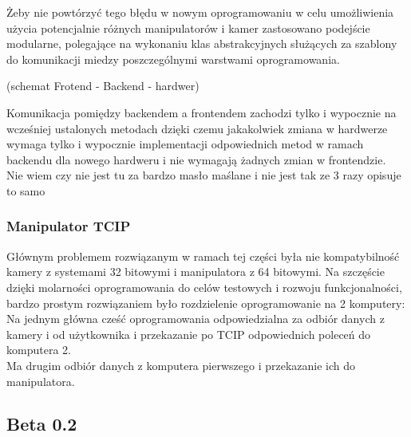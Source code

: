 \documentclass[11pt,a4paper]{article}
\begin{document}
    \hspace{1cm} Żeby nie powtórzyć tego błędu w nowym oprogramowaniu w celu umożliwienia użycia potencjalnie różnych manipulatorów i kamer zastosowano podejście modularne, polegające na wykonaniu klas abstrakcyjnych służących za szablony do komunikacji miedzy poszczególnymi warstwami oprogramowania.

            {\color{red}
    (schemat Frotend - Backend - hardwer)}


    \hspace{1cm}Komunikacja pomiędzy backendem a frontendem zachodzi tylko i wypocznie na wcześniej ustalonych metodach dzięki czemu jakakolwiek zmiana w hardwerze wymaga tylko i wypocznie implementacji odpowiednich metod w ramach backendu dla nowego hardweru i nie wymagają żadnych zmian w frontendzie.\\


    {\color{red}
    Nie wiem czy nie jest tu za bardzo masło maślane i nie jest tak ze 3 razy opisuje to samo}

    \subsubsection{Manipulator TCIP}

    \hspace{1cm}Głównym problemem rozwiązanym w ramach tej części była nie kompatybilność kamery z systemami 32 bitowymi i manipulatora z 64 bitowymi. Na szczęście dzięki molarności oprogramowania do celów testowych i rozwoju funkcjonalności, bardzo prostym rozwiązaniem było rozdzielenie oprogramowanie na 2 komputery:\\
    \hspace{1cm}Na jednym główna cześć oprogramowania odpowiedzialna za odbiór danych z kamery i od użytkownika i przekazanie po TCIP odpowiednich poleceń do komputera 2.\\
    \hspace{1cm}Ma drugim odbiór danych z komputera pierwszego i przekazanie ich do manipulatora.

    \subsection{Beta 0.2}
\end{document}
